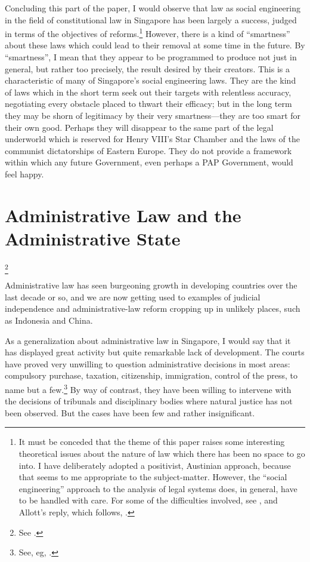 Concluding this part of the paper, I would observe that law as
social engineering in the field of constitutional law in
Singapore has been largely a success, judged in terms of the
objectives of reforms.\footnote{ It must be conceded that the
  theme of this paper raises some interesting theoretical issues
  about the nature of law which there has been no space to go
  into. I have deliberately adopted a positivist, Austinian
  approach, because that seems to me appropriate to the
  subject-matter. However, the ``social engineering'' approach to
  the analysis of legal systems does, in general, have to be
  handled with care. For some of the difficulties involved, see
  , and Allott's reply, which follows,
  .} However, there is a kind
of ``smartness'' about these laws which could lead to their
removal at some time in the future. By ``smartness'', I mean that
they appear to be programmed to produce not just in general, but
rather too precisely, the result desired by their creators. This
is a characteristic of many of Singapore's social engineering
laws. They are the kind of laws which in the short term seek out
their targets with relentless accuracy, negotiating every
obstacle placed to thwart their efficacy; but in the long term
they may be shorn of legitimacy by their very smartness---they
are too smart for their own good. Perhaps they will disappear to
the same part of the legal underworld which is reserved for Henry
VIII's Star Chamber and the laws of the communist dictatorships
of Eastern Europe. They do not provide a framework within which
any future Government, even perhaps a PAP Government, would feel
happy.


\section{Administrative Law and the Administrative State}\footnote{See .}

Administrative law has seen burgeoning growth in developing
countries over the last decade or so, and we are now getting used
to examples of judicial independence and administrative-law
reform cropping up in unlikely places, such as Indonesia and
China.

As a generalization about administrative law in Singapore, I
would say that it has displayed great activity but quite
remarkable lack of development. The courts have proved very
unwilling to question administrative decisions in most areas:
compulsory purchase, taxation, citizenship, immigration, control
of the press, to name but a few.\footnote{ See, eg,
  .} By way of contrast, they have
been willing to intervene with the decisions of tribunals and
disciplinary bodies where natural justice has not been observed.
But the cases have been few and rather insignificant.

